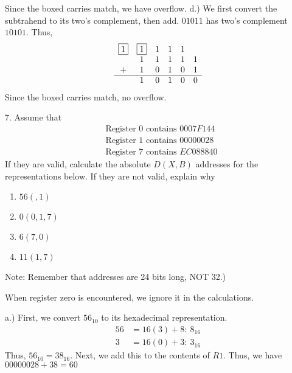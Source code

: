 \documentclass{report}
\begin{document}
    Since the boxed carries match, we have overflow.
    \bigbreak \noindent 
    d.) We first convert the subtrahend to its two's complement, then add. $01011$ has two's complement $10101$. Thus,
    \begin{align*}
        \begin{array}{cccccc}
            \boxed{1}&\boxed{1}&1&1&1& \\
             &1&1&1&1&1 \\
            +&1&0&1&0&1 \\
            \hline
             &1&0&1&0&0
        \end{array}
    \end{align*}
    \bigbreak \noindent 
    Since the boxed carries match, no overflow.

    \pagebreak \bigbreak \noindent 
    \begin{mdframed}
        7. Assume that
        \begin{align*}
            &\text{Register 0 contains $0007F144$} \\
            &\text{Register 1 contains $00000028$} \\
            &\text{Register 7 contains $EC088840$}
        \end{align*}
        If they are valid, calculate the absolute $D(X,B)$ addresses for the representations below.  If they are not valid, explain why
        \begin{enumerate}[label=(\alph*)]
            \item $56(,1)$
            \item $0(0,1,7)$
            \item $6(7,0)$
            \item $11(1,7)$
        \end{enumerate}
        Note: Remember that addresses are 24 bits long, NOT 32.)
    \end{mdframed}
    \bigbreak \noindent 
    \begin{remark}
    When register zero is encountered, we ignore it in the calculations.     
    \end{remark}
    \bigbreak \noindent 
    a.) First, we convert $56_{10}$ to its hexadecimal representation.
    \begin{align*}
        56 &= 16(3) + 8:\ 8_{16} \\
        3 &= 16(0) + 3:\ 3_{16}
    \end{align*}
    \bigbreak \noindent 
    Thus, $56_{10} = 38_{16}$. Next, we add this to the contents of $R1$. Thus, we have $00000028 + 38 = 60 $
\end{document}
